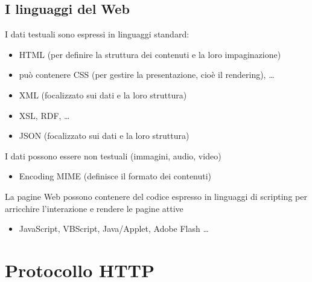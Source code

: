 \subsection{I linguaggi del Web}
I dati testuali sono espressi in linguaggi standard:
\begin{itemize}
    \item HTML (per definire la struttura dei contenuti e la loro impaginazione)
    \item può contenere CSS (per gestire la presentazione, cioè il rendering), …
    \item XML (focalizzato sui dati e la loro struttura)
    \item XSL, RDF, …
    \item JSON (focalizzato sui dati e la loro struttura)
\end{itemize}
I dati possono essere non testuali (immagini, audio, video)
\begin{itemize}
    \item Encoding MIME (definisce il formato dei contenuti)
\end{itemize}
La pagine Web possono contenere del codice espresso in linguaggi di scripting per arricchire l'interazione e rendere le pagine attive
\begin{itemize}
    \item JavaScript, VBScript, Java/Applet, Adobe Flash …
\end{itemize}

\section{Protocollo HTTP}
